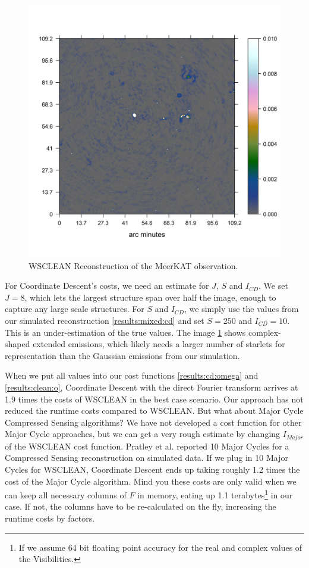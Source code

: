 \begin{figure}[h]
	\centering
	\includegraphics[width=0.6\linewidth]{./chapters/21.scalability/meerkat.png}
	\caption{WSCLEAN Reconstruction of the MeerKAT observation.}
	\label{scale:wsclean}
\end{figure}

For Coordinate Descent's costs, we need an estimate for $J$, $S$ and $I_{CD}$. We set $J=8$, which lets the largest structure span over half the image, enough to capture any large scale structures. For $S$ and $I_{CD}$, we simply use the values from our simulated reconstruction \ref{results:mixed:cd} and set $S=250$ and 
$I_{CD}=10$. This is an under-estimation of the true values. The image \ref{scale:wsclean} shows complex-shaped extended emissions, which likely needs a larger number of starlets for representation than the Gaussian emissions from our simulation. 

When we put all values into our cost functions \eqref{results:cd:omega} and \eqref{results:clean:o}, Coordinate Descent with the direct Fourier transform arrives at 1.9 times the costs of WSCLEAN in the best case scenario. Our approach has not reduced the runtime costs compared to WSCLEAN. But what about Major Cycle Compressed Sensing algorithms? We have not developed a cost function for other Major Cycle approaches, but we can get a very rough estimate by changing $I_{Major}$ of the WSCLEAN cost function. Pratley et al.\cite{pratley2018fast} reported 10 Major Cycles for a Compressed Sensing reconstruction on simulated data. If we plug in 10 Major Cycles for WSCLEAN, Coordinate Descent ends up taking roughly 1.2 times the cost of the Major Cycle algorithm. Mind you these costs are only valid when we can keep all necessary columns of $F$ in memory, eating up 1.1 terabytes\footnote{If we assume 64 bit floating point accuracy for the real and complex values of the Visibilities.} in our case. If not, the columns have to be re-calculated on the fly, increasing the runtime costs by factors. 


